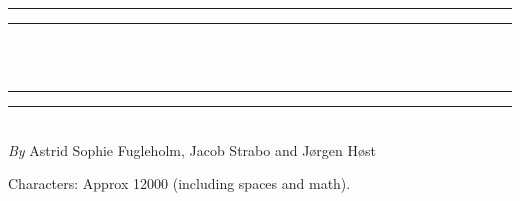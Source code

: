 \renewcommand{\baselinestretch}{2}
\begin{titlepage}

\begin{center}
        \scshape
		\rule{\textwidth}{1.6pt}\vspace*{-\baselineskip}\vspace*{2pt}
		\rule{\textwidth}{0.4pt}\\[\baselineskip]           
		{\huge \selectfont {Project 3: Car Demand and Home Market Bias}} \vspace{2mm} {\large\selectfont}\\ \vspace{2mm}
		\rule{\textwidth}{0.4pt}\vspace*{-\baselineskip}\vspace{3.2pt}
		\rule{\textwidth}{1.6pt}\\[\baselineskip] 
        
        {\Large \textit{By} Astrid Sophie Fugleholm, Jacob Strabo and Jørgen Høst} \\ \vspace{10mm}
       
\end{center}
Characters: Approx 12000 (including spaces and math). 

\end{titlepage}
